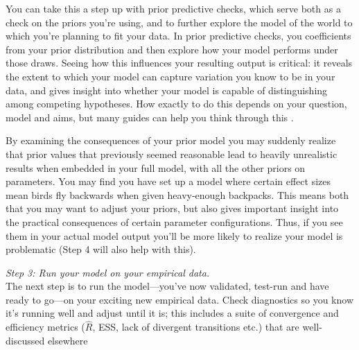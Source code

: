 \documentclass[11pt]{article}
\begin{document}
{You can take this a step up with prior predictive checks, which serve both as a check on the priors you're using, and to further explore the model of the world to which you're planning to fit your data. In prior predictive checks, you coefficients from your prior distribution and then explore how your model performs under those draws. Seeing how this influences your resulting output is critical: it reveals the extent to which your model can capture variation you know to be in your data, and gives insight into whether your model is capable of distinguishing among competing hypotheses. How exactly to do this depends on your question, model and aims, but many guides can help you think through this \citep{betanprior,wesner2021,winter2023}. 

By examining the consequences of your prior model you may suddenly realize that prior values that previously seemed reasonable lead to heavily unrealistic results when embedded in your full model, with all the other priors on parameters. You may find you have set up a model where certain effect sizes mean birds fly backwards when given heavy-enough backpacks. This means both that you may want to adjust your priors, but also gives important insight into the practical
consequences of certain parameter configurations. Thus, if you see them in your actual model output you'll be more likely to realize your model is problematic (Step 4 will also help with this).

 \emph{Step 3: Run your model on your empirical data.} \\
The next step is to run the model---you've now validated, test-run and have ready to go---on your exciting new empirical data. Check diagnostics so you know it's running well and adjust until it is; this includes a suite of convergence and efficiency metrics ($\hat{R}$, ESS, lack of divergent transitions etc.) that are well-discussed elsewhere \citep[and not our focus here, see instead][]{betanworkflow,gelman2020bayesian,vandeschoot2021,gabryvis}
 
}
\end{document}
